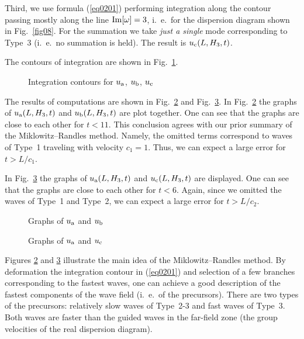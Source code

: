 \documentclass[12pt]{article}
\begin{document}
Third, we use formula (\ref{eq0201}) performing integration along the contour passing 
mostly along the line ${\rm Im}[\omega] = 3$, i.~e.\ for the dispersion diagram shown in 
Fig.~\ref{fig08}. For the summation we take {\em just a single\/} mode corresponding to 
Type~3 (i.~e.\ no summation is held). The result is $u_{\rm c}(L , H_3 , t)$. 

The contours of integration are shown in Fig.~\ref{fig12}. 
\begin{figure}[ht]
\centerline{}
\caption{Integration contours for $u_{\rm a}$, $u_{\rm b}$, $u_{\rm c}$} 
\label{fig12}
\end{figure}

The results of computations are shown in Fig.~\ref{fig13} and Fig.~\ref{fig14}. 
In Fig.~\ref{fig13} the graphs of $u_{\rm a} (L , H_3 , t)$
and $u_{\rm b} (L , H_3 , t)$ are plot together. One can see that the graphs are close to each other 
for $t < 11$. This conclusion agrees with our prior summary of the Miklowitz--Randles
method. Namely, the omitted terms correspond to waves of Type~1 traveling with velocity 
$c_1 = 1$. Thus, we can expect a large error for $t > L / c_1$. 

In Fig.~\ref{fig14} the graphs of  $u_{\rm a} (L , H_3 , t)$
and $u_{\rm c} (L , H_3 , t)$ are displayed. One can see that the graphs are close to each other for 
$t < 6$. Again, since we omitted the waves of Type~1 and Type~2, we can expect a large error
for $t > L / c_2$.    

\begin{figure}[ht]
\centerline{}
\caption{Graphs of $u_{\rm a}$ and $u_{\rm b}$} 
\label{fig13}
\end{figure}

\begin{figure}[ht]
\centerline{}
\caption{Graphs of $u_{\rm a}$ and $u_{\rm c}$} 
\label{fig14}
\end{figure}
  
Figures \ref{fig13} and \ref{fig14} illustrate the main idea of the Miklowitz--Randles method. 
By deformation the integration contour in (\ref{eq0201}) and selection of a few branches 
corresponding to the fastest waves, one can achieve a good description of the fastest components 
of the wave field (i.~e.\ of the precursors).    
There are two types of the precursors: relatively slow waves of Type~2-3 and fast waves 
of Type~3. Both waves are faster than the guided waves in the far-field zone (the group velocities 
of the real dispersion diagram). 
\end{document}
